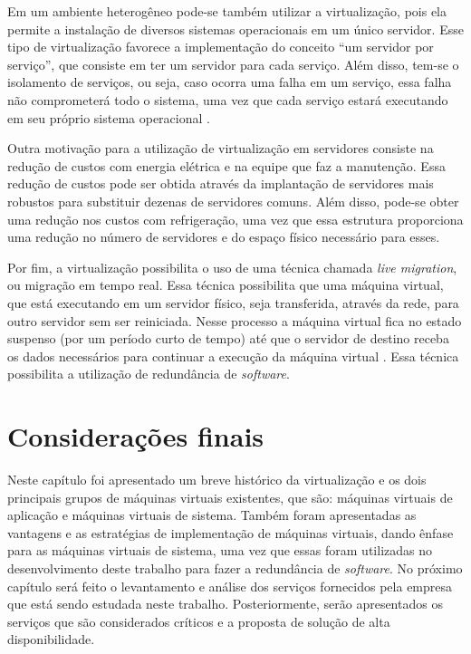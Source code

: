 
Em um ambiente heterogêneo pode-se também utilizar a virtualização, pois ela permite a instalação de diversos sistemas operacionais em um 
único servidor. Esse tipo de virtualização favorece a implementação do conceito ``um servidor por serviço'', que consiste em ter um servidor 
para cada serviço. Além disso, tem-se o isolamento de serviços, ou seja, caso ocorra uma falha em um serviço, essa falha não 
comprometerá todo o sistema, uma vez que cada serviço estará executando em seu próprio sistema operacional \cite{carissimi2008}.

Outra motivação para a utilização de virtualização em servidores consiste na redução de custos com energia elétrica e na equipe que faz a 
manutenção. Essa redução de custos pode ser obtida através da implantação de servidores mais robustos para substituir dezenas de servidores comuns. 
Além disso, pode-se obter uma redução nos custos com refrigeração, uma vez que essa estrutura proporciona uma redução no número de servidores
e do espaço físico necessário para esses.

Por fim, a virtualização possibilita o uso de uma técnica chamada \textit{live migration}, ou migração em tempo real. Essa técnica possibilita 
que uma máquina virtual, que está executando em um servidor físico, seja transferida, através da rede, para outro servidor sem ser reiniciada. 
Nesse processo a máquina virtual fica no estado suspenso (por um período curto de tempo) até que o servidor de destino receba os dados 
necessários para continuar a execução da máquina virtual \cite{silva2009}. Essa técnica possibilita a utilização de redundância de 
\textit{software}.

\section{Considerações finais}

Neste capítulo foi apresentado um breve histórico da virtualização e os dois principais grupos de máquinas virtuais existentes, que são: máquinas 
virtuais de aplicação e máquinas virtuais de sistema. Também foram apresentadas as vantagens e as estratégias de implementação de máquinas virtuais, 
dando ênfase para as máquinas virtuais de sistema, uma vez que essas foram utilizadas no desenvolvimento deste trabalho para fazer a redundância 
de \textit{software}. No próximo capítulo será feito o levantamento e análise dos serviços fornecidos pela empresa que está sendo estudada neste 
trabalho. Posteriormente, serão apresentados os serviços que são considerados críticos e a proposta de solução de alta disponibilidade.
